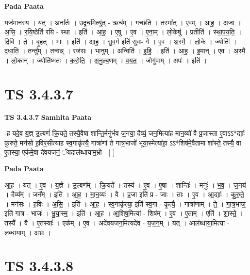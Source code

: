 \documentclass[17pt]{extarticle}
\begin{document}
\textbf{Pada Paata} \newline

यज॑मानस्य । यत् । अना᳚र्तः । उ॒दृच॒मित्यु॑त् - ऋच᳚म् । गच्छ॑ति । तस्मा᳚त् । ए॒वम् । आ॒ह॒ । अ॒जा । अ॒सि॒ । र॒यि॒ष्ठेति॑ रयि - स्था । इति॑ । आ॒ह॒ । ए॒षु । ए॒व । ए॒ना॒म् । लो॒केषु॑ । प्रतीति॑ । स्था॒प॒य॒ति॒ । दि॒वि । ते॒ । बृ॒हत् । भाः । इति॑ । आ॒ह॒ । सु॒व॒र्ग इति॑ सुवः- गे । ए॒व । अ॒स्मै॒ । लो॒के । ज्योतिः॑ । द॒धा॒ति॒ । तन्तु᳚म् । त॒न्वन्न् । रज॑सः । भा॒नुम् । अन्विति॑ । इ॒हि॒ । इति॑ । आ॒ह॒ । इ॒मान् । ए॒व । अ॒स्मै॒ । लो॒कान् । ज्योति॑ष्मतः । क॒रो॒ति॒ । अ॒नु॒ल्ब॒णम् । व॒य॒त॒ । जोगु॑वाम् । अपः॑ । इति॑ ।  \newline




\section*{ TS 3.4.3.7 }

\textbf{TS 3.4.3.7 } \newline
\textbf{Samhita Paata} \newline

-ह॒ यदे॒व य॒ज्ञ् उ॒ल्बणं॑ क्रि॒यते॒ तस्यै॒वैषा शान्ति॒र्मनु॑र्भव ज॒नया॒ दैव्यं॒ जन॒मित्या॑ह मान॒व्यो॑ वै प्र॒जास्ता ए॒वाऽऽ*द्याः᳚ कुरुते॒ मन॑सो ह॒विर॒सीत्या॑ह स्व॒गाकृ॑त्यै॒ गात्रा॑णां ते गात्र॒भाजो॑ भूया॒स्मेत्या॑हा॒ ऽऽ*शिष॑मे॒वैतामा शा᳚स्ते॒ तस्यै॒ वा ए॒तस्या॒ एक॑मे॒वा-दे॑वयजनं॒ ॅयदाल॑ब्धायाम॒भ्रो - [  ] \newline

\textbf{Pada Paata} \newline

आ॒ह॒ । यत् । ए॒व । य॒ज्ञे । उ॒ल्बण᳚म् । क्रि॒यते᳚ । तस्य॑ । ए॒व । ए॒षा । शान्तिः॑ । मनुः॑ । भ॒व॒ । ज॒नय॑ । दैव्य᳚म् । जन᳚म् । इति॑ । आ॒ह॒ । मा॒न॒व्यः॑ । वै । प्र॒जा इति॑ प्र - जाः । ताः । ए॒व । आ॒द्याः᳚ । कु॒रु॒ते॒ । मन॑सः । ह॒विः । अ॒सि॒ । इति॑ । आ॒ह॒ । स्व॒गाकृ॑त्या॒ इति॑ स्व॒गा - कृ॒त्यै॒ । गात्रा॑णाम् । ते॒ । गा॒त्र॒भाज॒ इति॑ गात्र - भाजः॑ । भू॒या॒स्म॒ । इति॑ । आ॒ह॒ । आ॒शिष॒मित्या᳚ - शिष᳚म् । ए॒व । ए॒ताम् । एति॑ । शा॒स्ते॒ । तस्यै᳚ । वै । ए॒तस्याः᳚ । एक᳚म् । ए॒व । अदे॑वयजन॒मित्यदे॑व - य॒ज॒न॒म् । यत् । आल॑ब्धाया॒मित्या - ल॒ब्धा॒या॒म् । अ॒भ्रः ।  \newline




\section*{ TS 3.4.3.8 }
\end{document}
